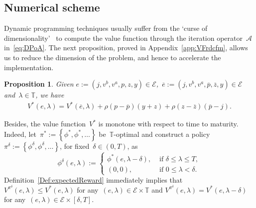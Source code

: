\documentclass{amsart}[11pt]
\numberwithin{equation}{section}
\newtheorem{proposition}[theorem]{Proposition}
\theoremstyle{definition}
\newcommand{\Ee}{\mathcal{E}}
\newcommand{\TT}{\mathbb{T}}
\newcommand{\Aa}{\mathcal{A}}
\begin{document}
\subsection{Numerical scheme}\label{sec:OptmStrtg}
Dynamic programming techniques usually suffer from the `curse of dimensionality'~\cite{powell2007approximate}
to compute the value function through the iteration operator~$\Aa$ in~\eqref{eq:DPoA}.
The next proposition, proved in Appendix~\ref{app:VFrdcfm}, 
allows us to reduce the dimension of the problem, and hence to accelerate the implementation.
\begin{proposition}\label{prop:VFrdcfm}
Given $e := (j, v^b, v^a, p, z, y)\in \Ee$,~$\overline{e} := (j, v^b, v^a, \overline{p}, \overline{z}, y)\in \Ee$ and~$\lambda\in\TT$,
we have
\begin{align*}
V^*(e, \lambda) 
= V^*(\overline{e}, \lambda) + \rho({p} - \overline{p})(y+{z}) + \rho({z} - \overline{z}) (\overline{p} - j).
\end{align*}
\end{proposition}
Besides, the value function~$V^*$ is monotone with respect to time to maturity. 
Indeed, let~$\pi^{*}:=\left\{\phi^*, \phi^*, \dots\right\}$ be~$\TT$-optimal 
and construct a policy~$\pi^{\delta} := \left\{\phi^\delta, \phi^\delta, \dots\right\}$,
for fixed~$\mathcal{\delta}\in(0, T)$, as
\begin{equation*}
\phi^{\delta}(e, \lambda)
:= 
 \left\{
 \begin{array}{ll}
\phi^*(e, \lambda-\delta), & \text{ if }\delta\leq\lambda\leq T,\\
(0, 0), & \text{ if }0\leq\lambda < \delta.
 \end{array}
\right.
\end{equation*}
Definition~\ref{Def:expectedReward} immediately implies 
that $V^{\pi^\delta}(e, \lambda) \leq V^*(e, \lambda)$
for any~$(e, \lambda)\in \Ee\times \TT$ and
$
V^{\pi^\delta}(e, \lambda) = V^*(e, \lambda - \delta)
$
for any~$(e, \lambda)\in \Ee\times [\delta, T]$.
\end{document}
